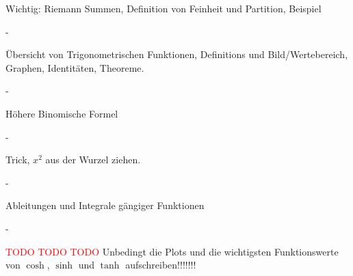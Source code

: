 \documentclass[a4paper,landscape,8pt]{extarticle}
\newcommand{\todo}{\textcolor{red}{TODO }}
\begin{document}
\begin{multicols*}{4}
\begin{warmup}
Wichtig: Riemann Summen, Definition von Feinheit und Partition, Beispiel

-

Übersicht von Trigonometrischen Funktionen,
Definitions und Bild/Wertebereich, Graphen, Identitäten, Theoreme.

-

Höhere Binomische Formel

-

Trick, $x^2$ aus der Wurzel ziehen.

-

Ableitungen und Integrale gängiger Funktionen

-

\todo \todo \todo Unbedingt die Plots und die wichtigsten Funktionswerte von
$\cosh$, $\sinh$ und $\tanh$ aufschreiben!!!!!!!

\end{warmup}

\end{multicols*}
\end{document}
